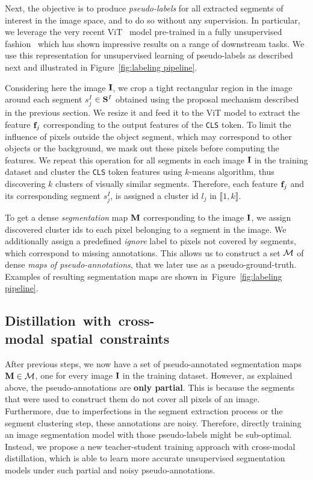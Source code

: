 \documentclass[runningheads]{llncs}
\begin{document}
Next, the objective is to produce \emph{pseudo-labels} for all extracted segments of interest in the image space, and to do so without any supervision. In particular, we leverage the very recent ViT~\cite{dosovitskiy2021image} model pre-trained in a fully unsupervised fashion~\cite{caron2021emerging} which has shown impressive results on a range of downstream tasks. We use this representation for unsupervised learning of pseudo-labels as described next and illustrated in Figure~\ref{fig:labeling pipeline}. 

Considering here the image $\mathbf{I}$, we crop a tight rectangular region in the image around each segment $s^I_{j}$ $\in \mathbf{S}^I$ obtained using the proposal mechanism described in the previous section. We resize it and feed it to the ViT model to extract the feature $\mathbf{f}_{j}$ corresponding to the output features of the \texttt{CLS} token. To limit the influence of pixels outside the object segment, which may correspond to other objects or the background, we mask out these pixels before computing the features. We repeat this operation for all segments in each image $\mathbf{I}$ in the training dataset and cluster the \texttt{CLS} token features using $k$-means algorithm, thus discovering $k$ clusters of visually similar segments. Therefore, each feature $\mathbf{f}_{j}$ and its corresponding segment $s^I_{j}$, is assigned a cluster id $l_{j}$ in $\llbracket 1, k\rrbracket$.

To get a dense \emph{segmentation} map $\mathbf{M}$ corresponding to the image $\mathbf{I}$, we assign discovered cluster ids to each pixel belonging to a segment in the image. We additionally assign a predefined \emph{ignore} label to pixels not covered by segments, which correspond to missing annotations. This allows us to construct a set $\mathcal{M}$ of dense \emph{maps of pseudo-annotations}, that we later use as a pseudo-ground-truth. Examples of resulting segmentation maps are shown in~Figure~\ref{fig:labeling pipeline}.

\subsection{\mbox{Distillation with cross-modal spatial constraints}}
\label{sec:distillation}

After previous steps, we now have a set of pseudo-annotated segmentation maps $\mathbf{M} \in \mathcal{M}$, one for every image $\mathbf{I}$ in the training dataset. However, as explained above, the pseudo-annotations are \textbf{only partial}. This is because the segments that were used to construct them do not cover all pixels of an image. Furthermore, due to imperfections in the segment extraction process or the segment clustering step, these annotations are noisy. Therefore, directly training an image segmentation model with those pseudo-labels might be sub-optimal. Instead, we propose a new teacher-student training approach with cross-modal distillation, which is able to learn more accurate unsupervised segmentation models under such partial and noisy pseudo-annotations. 
\end{document}
